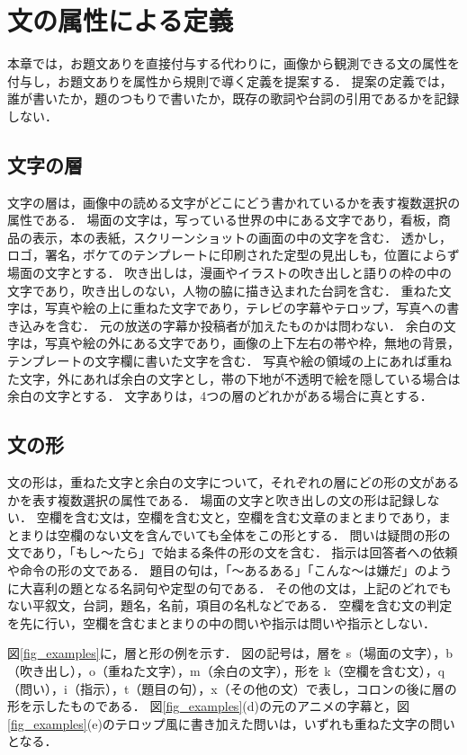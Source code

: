 \section{文の属性による定義}
\label{sec_attr}
本章では，お題文ありを直接付与する代わりに，画像から観測できる文の属性を付与し，お題文ありを属性から規則で導く定義を提案する．
提案の定義では，誰が書いたか，題のつもりで書いたか，既存の歌詞や台詞の引用であるかを記録しない．

\subsection{文字の層}
文字の層は，画像中の読める文字がどこにどう書かれているかを表す複数選択の属性である．
場面の文字は，写っている世界の中にある文字であり，看板，商品の表示，本の表紙，スクリーンショットの画面の中の文字を含む．
透かし，ロゴ，署名，ボケてのテンプレートに印刷された定型の見出しも，位置によらず場面の文字とする．
吹き出しは，漫画やイラストの吹き出しと語りの枠の中の文字であり，吹き出しのない，人物の脇に描き込まれた台詞を含む．
重ねた文字は，写真や絵の上に重ねた文字であり，テレビの字幕やテロップ，写真への書き込みを含む．
元の放送の字幕か投稿者が加えたものかは問わない．
余白の文字は，写真や絵の外にある文字であり，画像の上下左右の帯や枠，無地の背景，テンプレートの文字欄に書いた文字を含む．
写真や絵の領域の上にあれば重ねた文字，外にあれば余白の文字とし，帯の下地が不透明で絵を隠している場合は余白の文字とする．
文字ありは，4つの層のどれかがある場合に真とする．

\subsection{文の形}
文の形は，重ねた文字と余白の文字について，それぞれの層にどの形の文があるかを表す複数選択の属性である．
場面の文字と吹き出しの文の形は記録しない．
空欄を含む文は，空欄を含む文と，空欄を含む文章のまとまりであり，まとまりは空欄のない文を含んでいても全体をこの形とする．
問いは疑問の形の文であり，「もし〜たら」で始まる条件の形の文を含む．
指示は回答者への依頼や命令の形の文である．
題目の句は，「〜あるある」「こんな〜は嫌だ」のように大喜利の題となる名詞句や定型の句である．
その他の文は，上記のどれでもない平叙文，台詞，題名，名前，項目の名札などである．
空欄を含む文の判定を先に行い，空欄を含むまとまりの中の問いや指示は問いや指示としない．

図\ref{fig_examples}に，層と形の例を示す．
図の記号は，層を s（場面の文字），b（吹き出し），o（重ねた文字），m（余白の文字），形を k（空欄を含む文），q（問い），i（指示），t（題目の句），x（その他の文）で表し，コロンの後に層の形を示したものである．
図\ref{fig_examples}(d)の元のアニメの字幕と，図\ref{fig_examples}(e)のテロップ風に書き加えた問いは，いずれも重ねた文字の問いとなる．


